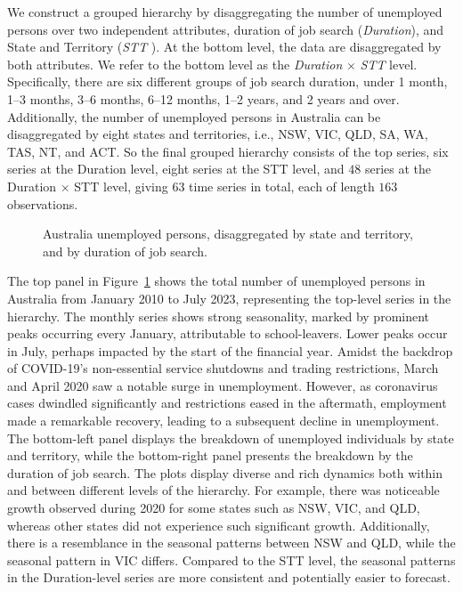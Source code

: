 \documentclass[
  11pt]{article}
\theoremstyle{plain}
\theoremstyle{remark}
\begin{document}
We construct a grouped hierarchy by disaggregating the number of
unemployed persons over two independent attributes, duration of job
search (\emph{Duration}), and State and Territory (\emph{STT} ). At the
bottom level, the data are disaggregated by both attributes. We refer to
the bottom level as the \emph{Duration} \(\times\) \emph{STT} level.
Specifically, there are six different groups of job search duration,
under 1 month, 1--3 months, 3--6 months, 6--12 months, 1--2 years, and 2
years and over. Additionally, the number of unemployed persons in
Australia can be disaggregated by eight states and territories, i.e.,
NSW, VIC, QLD, SA, WA, TAS, NT, and ACT. So the final grouped hierarchy
consists of the top series, six series at the Duration level, eight
series at the STT level, and \(48\) series at the Duration \(\times\)
STT level, giving \(63\) time series in total, each of length \(163\)
observations.

\begin{figure}[!t]


\caption{\label{fig-labour-data}Australia unemployed persons,
disaggregated by state and territory, and by duration of job search.}

\end{figure}%

The top panel in Figure~\ref{fig-labour-data} shows the total number of
unemployed persons in Australia from January 2010 to July 2023,
representing the top-level series in the hierarchy. The monthly series
shows strong seasonality, marked by prominent peaks occurring every
January, attributable to school-leavers. Lower peaks occur in July,
perhaps impacted by the start of the financial year. Amidst the backdrop
of COVID-19's non-essential service shutdowns and trading restrictions,
March and April 2020 saw a notable surge in unemployment. However, as
coronavirus cases dwindled significantly and restrictions eased in the
aftermath, employment made a remarkable recovery, leading to a
subsequent decline in unemployment. The bottom-left panel displays the
breakdown of unemployed individuals by state and territory, while the
bottom-right panel presents the breakdown by the duration of job search.
The plots display diverse and rich dynamics both within and between
different levels of the hierarchy. For example, there was noticeable
growth observed during 2020 for some states such as NSW, VIC, and QLD,
whereas other states did not experience such significant growth.
Additionally, there is a resemblance in the seasonal patterns between
NSW and QLD, while the seasonal pattern in VIC differs. Compared to the
STT level, the seasonal patterns in the Duration-level series are more
consistent and potentially easier to forecast.
\end{document}

